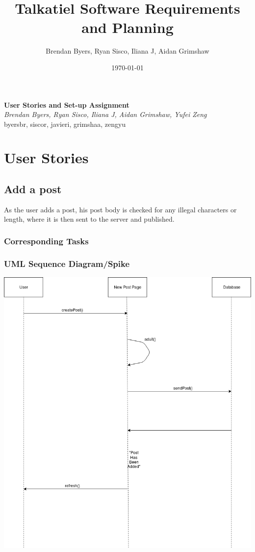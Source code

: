 \documentclass[12pt]{article}
\title{Talkatiel Software Requirements and Planning}
\author{Brendan Byers, Ryan Sisco, Iliana J, Aidan Grimshaw}
\date{\today}
\begin{document}
\begin{center}
      \Large\textbf{User Stories and Set-up Assignment}\\
      \large\textit{Brendan Byers, Ryan Sisco, Iliana J, Aidan Grimshaw, Yufei Zeng}\\
      \large{byersbr, siscor, javieri, grimshaa, zengyu}\\
   \end{center}

\tableofcontents

\section{User Stories}

\subsection{Add a post}
As the user adds a post, his post body is checked for any illegal characters or
length, where it is then sent to the server and published.
\subsubsection{Corresponding Tasks}
\subsubsection{UML Sequence Diagram/Spike}
\includegraphics[scale=1,bb=0 0 30 30]{img/story_1.png}\linebreak
\end{document}

